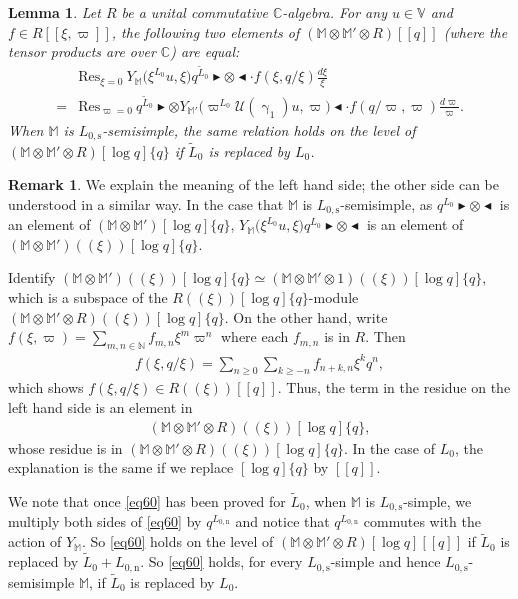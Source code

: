 \documentclass[12pt,a4paper,notitlepage]{article}
\theoremstyle{definition}
\newtheorem{rem}[df]{Remark}
\theoremstyle{plain}
\newtheorem{lm}[df]{Lemma}
\newcommand{\mc}{\mathcal}
\newcommand{\wtd}{\widetilde}
\newcommand{\Res}{\mathrm{Res}}
\newcommand{\Vbb}{\mathbb V}
\newcommand{\Mbb}{\mathbb M}
\newcommand{\Cbb}{\mathbb C}
\newcommand{\Nbb}{\mathbb N}
\newcommand{\btl}{\blacktriangleleft}
\newcommand{\btr}{\blacktriangleright}
\newcommand{\Lss}{L_{0,\mathrm{s}}}
\newcommand{\Lni}{{L_{0,\mathrm{n}}}}
\numberwithin{equation}{section}
\begin{document}
\begin{lm}\label{lb32}
	Let $R$ be a unital commutative $\Cbb$-algebra.  For any $u\in\Vbb$ and $f\in R[[\xi,\varpi]]$, the following two elements of $(\Mbb\otimes\Mbb'\otimes R)[[q]]$ (where the tensor products are over $\Cbb$) are equal:
	\begin{align}
	&\Res_{\xi=0}~Y_{\Mbb}\big(\xi^{L_0}u,\xi\big)q^{\wtd L_0}\btr\otimes\btl\cdot f(\xi,q/\xi)\frac{d\xi}{\xi}\nonumber\\
	=&\Res_{\varpi=0}~q^{\wtd L_0}\btr\otimes Y_{\Mbb'}\big(\varpi^{L_0}\mc U(\upgamma_1)u,\varpi\big)\btl\cdot f(q/\varpi,\varpi)\frac{d\varpi}{\varpi}.\label{eq60}
	\end{align}
When $\Mbb$ is $\Lss$-semisimple, the same relation holds on the level of $(\Mbb\otimes\Mbb'\otimes R)[\log q]\{q\}$ if $\wtd L_0$ is replaced by $L_0$.
\end{lm}


\begin{rem}\label{lb33}
We  explain the meaning of the left hand side; the other side can be understood in a similar way. In the case that $\Mbb$ is $\Lss$-semisimple, as   $q^{L_0}\btr\otimes\btl$  is an element of $(\Mbb\otimes\Mbb')[\log q]\{q\}$, $Y_{\Mbb}\big(\xi^{L_0}u,\xi\big)q^{L_0}\btr\otimes\btl$ is an element of $(\Mbb\otimes\Mbb')((\xi))[\log q]\{q\}$. 

Identify $(\Mbb\otimes\Mbb')((\xi))[\log q]\{q\}\simeq (\Mbb\otimes\Mbb'\otimes 1)((\xi))[\log q]\{q\}$, which is a subspace of the $R((\xi))[\log q]\{q\}$-module $(\Mbb\otimes\Mbb'\otimes R)((\xi))[\log q]\{q\}$.  On the other hand,  write $f(\xi,\varpi)=\sum_{m,n\in\Nbb}f_{m,n}\xi^m\varpi^n$ where each $f_{m,n}$ is in $R$. Then
	\begin{align*}
	f(\xi,q/\xi)=\sum_{n\geq 0}\sum_{k\geq -n}f_{n+k,n}\xi^k q^n,
	\end{align*}
	which shows $f(\xi,q/\xi)\in R((\xi))[[q]]$. Thus, the term in the residue on the left hand side is an element in
	\begin{align*}
	(\Mbb\otimes\Mbb'\otimes R)((\xi))[\log q]\{q\},
	\end{align*}
	whose residue is in $(\Mbb\otimes\Mbb'\otimes R)((\xi))[\log q]\{q\}$. In the case of $L_0$, the explanation is the same if we replace $[\log q]\{q\}$ by $[[q]]$.
	
We note that once \eqref{eq60} has been proved for $\wtd L_0$, when $\Mbb$ is $\Lss$-simple, we multiply both sides of \eqref{eq60} by $q^\Lni$ and notice that $q^\Lni$ commutes with the action of $Y_\Mbb$. So \eqref{eq60} holds on the level of $(\Mbb\otimes\Mbb'\otimes R)[\log q][[q]]$ if $\wtd L_0$ is replaced by $\wtd L_0+\Lni$. So \eqref{eq60} holds, for every $\Lss$-simple and hence $\Lss$-semisimple $\Mbb$, if $\wtd L_0$ is replaced	by $L_0$.
\end{rem}
\end{document}
